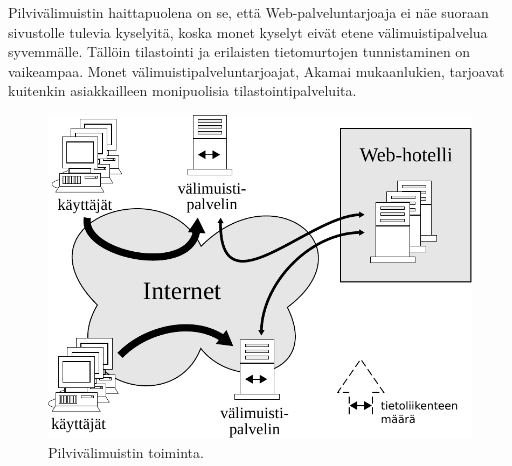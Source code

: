 Pilvivälimuistin haittapuolena on se, että Web-palveluntarjoaja ei näe
suoraan sivustolle tulevia kyselyitä, koska monet kyselyt eivät etene
välimuistipalvelua syvemmälle. Tällöin tilastointi ja erilaisten tietomurtojen
tunnistaminen on vaikeampaa. Monet välimuistipalveluntarjoajat, Akamai
mukaanlukien, tarjoavat kuitenkin asiakkailleen monipuolisia tilastointipalveluita.

\begin{figure}[htp]
\centering
\includegraphics[width=12cm]{pics/cloudcache.pdf}
\caption{Pilvivälimuistin toiminta.}
\label{cloudcache}
\end{figure}
